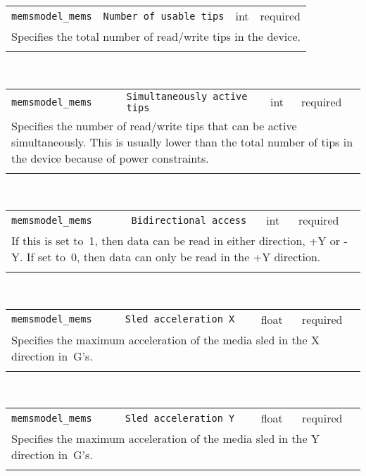 \noindent 
\begin{tabular}{|p{\lpmodwidth}|p{\lpnamewidth}|p{0.5in}|p{0.5in}|}
\cline{1-4}
\texttt{memsmodel\_mems} & \texttt{Number of usable tips} & int & required \\ 
\cline{1-4}
\multicolumn{4}{|p{6in}|}{
Specifies the total number of read/write tips in the device.
}\\ 
\cline{1-4}
\multicolumn{4}{p{5in}}{}\\
\end{tabular}\\ 
\noindent 
\begin{tabular}{|p{\lpmodwidth}|p{\lpnamewidth}|p{0.5in}|p{0.5in}|}
\cline{1-4}
\texttt{memsmodel\_mems} & \texttt{Simultaneously active tips} & int & required \\ 
\cline{1-4}
\multicolumn{4}{|p{6in}|}{
Specifies the number of read/write tips that can be active
simultaneously. This is usually lower than the total number of tips
in the device because of power constraints.
}\\ 
\cline{1-4}
\multicolumn{4}{p{5in}}{}\\
\end{tabular}\\ 
\noindent 
\begin{tabular}{|p{\lpmodwidth}|p{\lpnamewidth}|p{0.5in}|p{0.5in}|}
\cline{1-4}
\texttt{memsmodel\_mems} & \texttt{Bidirectional access} & int & required \\ 
\cline{1-4}
\multicolumn{4}{|p{6in}|}{
If this is set to~1, then data can be read in either direction, +Y or
-Y. If set to~0, then data can only be read in the +Y direction.
}\\ 
\cline{1-4}
\multicolumn{4}{p{5in}}{}\\
\end{tabular}\\ 
\noindent 
\begin{tabular}{|p{\lpmodwidth}|p{\lpnamewidth}|p{0.5in}|p{0.5in}|}
\cline{1-4}
\texttt{memsmodel\_mems} & \texttt{Sled acceleration X} & float & required \\ 
\cline{1-4}
\multicolumn{4}{|p{6in}|}{
Specifies the maximum acceleration of the media sled in the X
direction in~G's.
}\\ 
\cline{1-4}
\multicolumn{4}{p{5in}}{}\\
\end{tabular}\\ 
\noindent 
\begin{tabular}{|p{\lpmodwidth}|p{\lpnamewidth}|p{0.5in}|p{0.5in}|}
\cline{1-4}
\texttt{memsmodel\_mems} & \texttt{Sled acceleration Y} & float & required \\ 
\cline{1-4}
\multicolumn{4}{|p{6in}|}{
Specifies the maximum acceleration of the media sled in the Y
direction in~G's.
}\\ 
\cline{1-4}
\multicolumn{4}{p{5in}}{}\\
\end{tabular}\\ 
